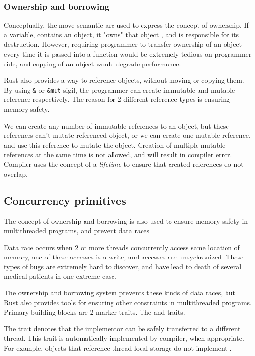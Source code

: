 \subsubsection{Ownership and borrowing}
Conceptually, the move semantic are used to express the concept of ownership. If a variable, contains an object, it "owns"
that object , and is responsible for its destruction. However, requiring programmer to transfer ownership of an object every time
it is passed into a function would be extremely tedious on programmer side, and copying of an object would degrade performance.

Rust also provides a way to reference objects, without moving or copying them. By using \verb|&| or
\verb|&mut| sigil, the programmer can create immutable and mutable reference respectively. The reason for 2 different
reference types is ensuring memory safety.

We can create any number of immutable references to an object, but these references can't mutate referenced object, or
we can create one mutable reference, and use this reference to mutate the object. Creation of multiple mutable references
at the same time is not allowed, and will result in compiler error. Compiler uses the concept of a \textit{lifetime} to ensure that created
references do not overlap.

\subsection{Concurrency primitives}
The concept of ownership and borrowing is also used to ensure memory safety in multithreaded programs, and prevent
data races

Data race occurs when 2 or more threads concurrently access same location of memory, one of these accesses is a write,
and accesses are unsychronized. These types of bugs are extremely hard to discover, and have lead to death of several medical patients in
one extreme case\cite{article:therac}.

The ownership and borrowing system prevents these kinds of data races, but Rust also provides tools for ensuring other
constraints in multithreaded programs. Primary building blocks are 2 marker traits. The  and  traits.

The  trait denotes that the implementor can be safely transferred to a different thread. This trait is automatically
implemented by compiler, when appropriate. For example, objects that reference thread local storage do not implement .

